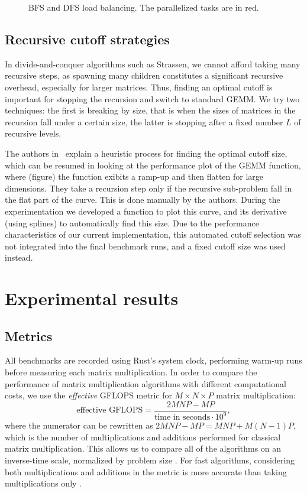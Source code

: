 \documentclass[a4paper, leqno, 11pt]{article}
\theoremstyle{definition}
\theoremstyle{remark}
\theoremstyle{experimental}
\begin{document}
\begin{figure}[ht]
  \centering
  \resizebox{0.9\textwidth}{!}{%
    
  }%
  \caption{BFS and DFS load balancing. The parallelized tasks are in red.}
  \label{fig:load_balancing}
\end{figure}


\subsection{Recursive cutoff strategies}

In divide-and-conquer algorithms such as Strassen, we cannot afford taking many recursive steps, as
spawning many children constitutes a significant recursive overhead, especially for larger matrices.
Thus, finding an optimal cutoff is important for stopping the recursion and switch to standard GEMM.
We try two techniques: the first is breaking by size, that is when the sizes of matrices in the recursion fall
under a certain size, the latter is stopping after a fixed number $ L $ of recursive levels.

The authors in~\cite{bensonballard2015} explain a heuristic process for finding the optimal cutoff
size, which can be resumed in looking at the performance plot of the GEMM function, where (figure)
the function exibits a ramp-up and then flatten for large dimensions. They take a
recursion step only if the recursive sub-problem fall in the flat part of the curve. This is done
manually by the authors. During the experimentation we developed a function to plot this curve, and
its derivative (using splines) to automatically find this size. Due to the performance characteristics of our current implementation, this automated cutoff selection was not integrated into the final benchmark runs, and a fixed cutoff size was used instead.


\section{Experimental results}
\label{sec:results}

\subsection{Metrics}

All benchmarks are recorded using Rust's system clock, performing warm-up runs before measuring
each matrix multiplication. In order to compare the performance of matrix multiplication algorithms with different
computational costs, we use the \emph{effective} GFLOPS metric for $ M \times N\times P $ matrix
multiplication:
\begin{equation}
  \text{effective GFLOPS} = \frac{2MNP - MP}{\text{time in seconds} \cdot 10^9},
\end{equation}
where the numerator can be rewritten as $2MNP - MP = MNP + M(N-1)P$, which is the number of
multiplications and additions performed for classical matrix multiplication. This allows us to
compare all of the algorithms on an inverse-time scale, normalized by problem size
\cite{bensonballard2015}. For fast algorithms, considering both multiplications and additions in the metric is more
accurate than taking multiplications only \cite{commavoidingstrass}.
\end{document}
